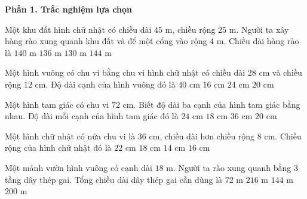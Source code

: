 \textbf{Phần 1. Trắc nghiệm lựa chọn}

\begin{ex} %
Một khu đất hình chữ nhật có chiều dài $45\text{ m}$, chiều rộng $25\text{ m}$. Người ta xây hàng rào xung quanh khu đất và để một cổng vào rộng $4\text{ m}$. Chiều dài hàng rào là
\choice
{$140\text{ m}$}
{\True $136\text{ m}$}
{$130\text{ m}$}
{$144\text{ m}$}
\end{ex}

\begin{ex} %
Một hình vuông có chu vi bằng chu vi hình chữ nhật có chiều dài $28\text{ cm}$ và chiều rộng $12\text{ cm}$. Độ dài cạnh của hình vuông đó là
\choice
{$40\text{ cm}$}
{$16\text{ cm}$}
{$24\text{ cm}$}
{\True $20\text{ cm}$}
\end{ex}

\begin{ex} %
Một hình tam giác có chu vi $72\text{ cm}$. Biết độ dài ba cạnh của hình tam giác bằng nhau. Độ dài mỗi cạnh của hình tam giác đó là
\choice
{\True $24\text{ cm}$}
{$18\text{ cm}$}
{$36\text{ cm}$}
{$20\text{ cm}$}
\end{ex}

\begin{ex} %
Một hình chữ nhật có nửa chu vi là $36\text{ cm}$, chiều dài hơn chiều rộng $8\text{ cm}$. Chiều rộng của hình chữ nhật đó là
\choice
{$22\text{ cm}$}
{$18\text{ cm}$}
{\True $14\text{ cm}$}
{$16\text{ cm}$}
\end{ex}

\begin{ex} %
Một mảnh vườn hình vuông có cạnh dài $18\text{ m}$. Người ta rào xung quanh bằng 3 tầng dây thép gai. Tổng chiều dài dây thép gai cần dùng là
\choice
{$72\text{ m}$}
{\True $216\text{ m}$}
{$144\text{ m}$}
{$200\text{ m}$}
\end{ex}


